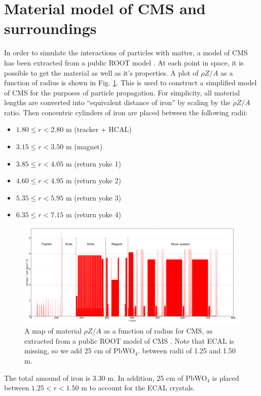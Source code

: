 \documentclass[11pt]{article}
\begin{document}
\section{Material model of CMS and surroundings}
In order to simulate the interactions of particles with matter, a model of CMS has been extracted from a public ROOT model \cite{ROOT_cms}.
At each point in space, it is possible to get the material as well as it's properties. A plot of $\rho Z/A$ as a function of radius is
shown in Fig. \ref{fig:cmsdensity}. This is used to construct a simplified model of CMS for the purposes of particle propagation.
For simplicity, all material lengths are converted into ``equivalent distance of iron'' by scaling by the $\rho Z/A$ ratio. Then concentric
cylinders of iron are placed between the following radii:
\begin{itemize}
\item $1.80 \leq r < 2.80$ m (tracker + HCAL)
\item $3.15 \leq r < 3.50$ m (magnet)
\item $3.85 \leq r < 4.05$ m (return yoke 1)
\item $4.60 \leq r < 4.95$ m (return yoke 2)
\item $5.35 \leq r < 5.95$ m (return yoke 3)
\item $6.35 \leq r < 7.15$ m (return yoke 4)
\end{itemize}

\begin{figure}
\centering
\includegraphics[width=0.99\textwidth]{plots/cms_density_map.pdf}
\caption{A map of material $\rho Z/A$ as a function of radius for CMS, as extracted from a public ROOT model of CMS \cite{ROOT_cms}.
Note that ECAL is missing, so we add 25 cm of PbWO$_4$. between radii of 1.25 and 1.50 m.}
\label{fig:cmsdensity}
\end{figure}

The total amound of iron is 3.30 m. In addition, 25 cm of PbWO$_4$ is placed between $1.25 < r < 1.50$ m to account for the ECAL crystals.
\end{document}
